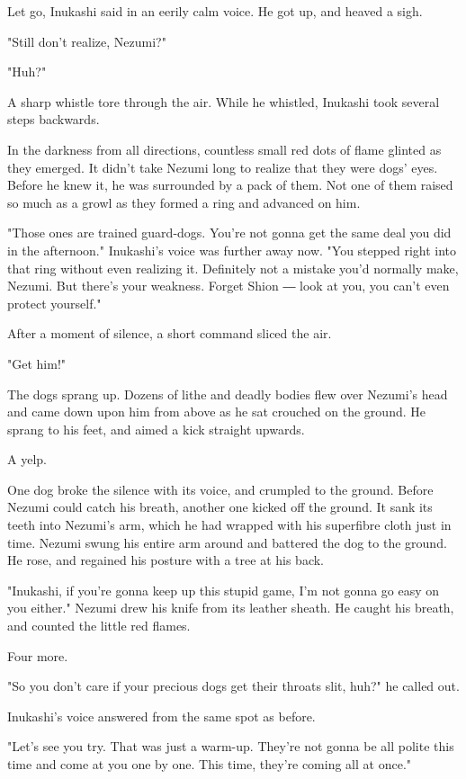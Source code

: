 Let go, Inukashi said in an eerily calm voice. He got up, and heaved a
sigh.

"Still don't realize, Nezumi?"

"Huh?"

A sharp whistle tore through the air. While he whistled, Inukashi took
several steps backwards.

In the darkness from all directions, countless small red dots of flame
glinted as they emerged. It didn't take Nezumi long to realize that they
were dogs' eyes. Before he knew it, he was surrounded by a pack of them.
Not one of them raised so much as a growl as they formed a ring and
advanced on him.

"Those ones are trained guard-dogs. You're not gonna get the same deal
you did in the afternoon." Inukashi's voice was further away now. "You
stepped right into that ring without even realizing it. Definitely not a
mistake you'd normally make, Nezumi. But there's your weakness. Forget
Shion ― look at you, you can't even protect yourself."

After a moment of silence, a short command sliced the air.

"Get him!"

The dogs sprang up. Dozens of lithe and deadly bodies flew over Nezumi's
head and came down upon him from above as he sat crouched on the ground.
He sprang to his feet, and aimed a kick straight upwards.

A yelp.

One dog broke the silence with its voice, and crumpled to the ground.
Before Nezumi could catch his breath, another one kicked off the ground.
It sank its teeth into Nezumi's arm, which he had wrapped with his
superfibre cloth just in time. Nezumi swung his entire arm around and
battered the dog to the ground. He rose, and regained his posture with a
tree at his back.

"Inukashi, if you're gonna keep up this stupid game, I'm not gonna go
easy on you either." Nezumi drew his knife from its leather sheath. He
caught his breath, and counted the little red flames.

Four more.

"So you don't care if your precious dogs get their throats slit, huh?"
he called out.

Inukashi's voice answered from the same spot as before.

"Let's see you try. That was just a warm-up. They're not gonna be all
polite this time and come at you one by one. This time, they're coming
all at once."

